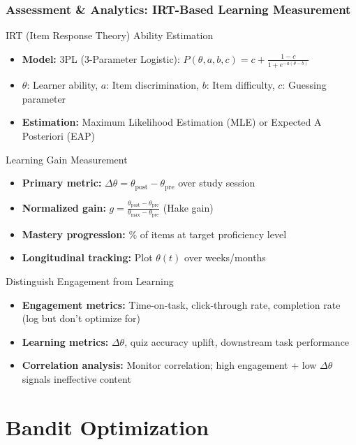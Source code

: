 \documentclass[aspectratio=169]{beamer}
\begin{document}
\begin{frame}
\frametitle{Assessment \& Analytics: IRT-Based Learning Measurement}
\begin{block}{IRT (Item Response Theory) Ability Estimation}
\begin{itemize}
\item \textbf{Model:} 3PL (3-Parameter Logistic): $P(\theta, a, b, c) = c + \frac{1-c}{1 + e^{-a(\theta - b)}}$
\item $\theta$: Learner ability, $a$: Item discrimination, $b$: Item difficulty, $c$: Guessing parameter
\item \textbf{Estimation:} Maximum Likelihood Estimation (MLE) or Expected A Posteriori (EAP)
\end{itemize}
\end{block}

\begin{block}{Learning Gain Measurement}
\begin{itemize}
\item \textbf{Primary metric:} $\Delta\theta = \theta_{\text{post}} - \theta_{\text{pre}}$ over study session
\item \textbf{Normalized gain:} $g = \frac{\theta_{\text{post}} - \theta_{\text{pre}}}{\theta_{\text{max}} - \theta_{\text{pre}}}$ (Hake gain)
\item \textbf{Mastery progression:} \% of items at target proficiency level
\item \textbf{Longitudinal tracking:} Plot $\theta(t)$ over weeks/months
\end{itemize}
\end{block}

\begin{block}{Distinguish Engagement from Learning}
\begin{itemize}
\item \textbf{Engagement metrics:} Time-on-task, click-through rate, completion rate (log but don't optimize for)
\item \textbf{Learning metrics:} $\Delta\theta$, quiz accuracy uplift, downstream task performance
\item \textbf{Correlation analysis:} Monitor correlation; high engagement + low $\Delta\theta$ signals ineffective content
\end{itemize}
\end{block}
\end{frame}

\section{Bandit Optimization}
\end{document}
